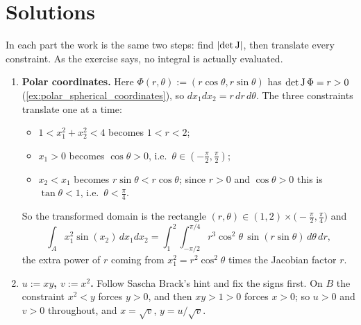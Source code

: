\section{Solutions}
\label{sec:change_of_variables_solutions}

\begin{exercisesolution}
\label{sol:change_of_variables_computations}
In each part the work is the same two steps: find $\lvert\det\operatorname{J}\rvert$, then translate every
constraint. As the exercise says, no integral is actually evaluated.
\begin{enumerate}[label=\textbf{(\alph*)}]
  \item \textbf{Polar coordinates.} Here $\Phi(r,\theta) := (r\cos\theta, r\sin\theta)$ has
    $\det\operatorname{J}\Phi = r > 0$ (\cref{ex:polar_spherical_coordinates}), so
    $dx_1dx_2 = r\,dr\,d\theta$. The three constraints translate one at a time:
    \begin{itemize}
      \item $1 < x_1^2+x_2^2 < 4$ becomes $1 < r < 2$;
      \item $x_1 > 0$ becomes $\cos\theta > 0$, i.e.\ $\theta \in (-\tfrac\pi2, \tfrac\pi2)$;
      \item $x_2 < x_1$ becomes $r\sin\theta < r\cos\theta$; since $r > 0$ and $\cos\theta > 0$
        this is $\tan\theta < 1$, i.e.\ $\theta < \tfrac\pi4$.
    \end{itemize}
    So the transformed domain is the rectangle
    $(r,\theta) \in (1,2)\times\big(-\tfrac\pi2,\tfrac\pi4\big)$ and
    \[\int_A x_1^2\sin(x_2)\,dx_1dx_2
      = \int_{1}^{2}\!\!\int_{-\pi/2}^{\pi/4} r^3\cos^2\theta\,\sin(r\sin\theta)\,d\theta\,dr,\]
    the extra power of $r$ coming from $x_1^2 = r^2\cos^2\theta$ times the Jacobian factor $r$.
  \item \textbf{$u := xy$, $v := x^2$.} Follow Sascha Brack's hint and fix the signs first. On $B$
    the constraint $x^2 < y$ forces $y > 0$, and then $xy > 1 > 0$ forces $x > 0$; so
    $u > 0$ and $v > 0$ throughout, and $x = \sqrt v$, $y = u/\sqrt v$.


\end{enumerate}
\end{exercisesolution}

